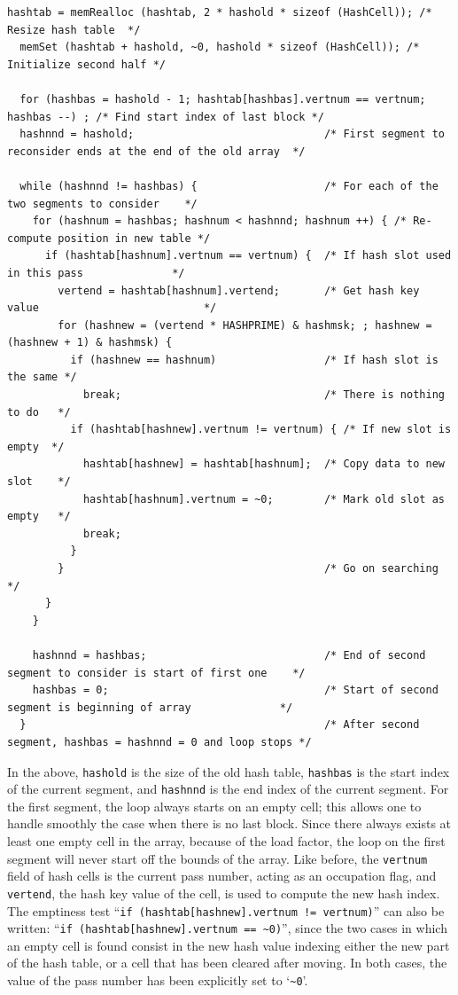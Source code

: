 \begin{lstlisting}[style=language-c]
  hashtab = memRealloc (hashtab, 2 * hashold * sizeof (HashCell)); /* Resize hash table  */
  memSet (hashtab + hashold, ~0, hashold * sizeof (HashCell)); /* Initialize second half */

  for (hashbas = hashold - 1; hashtab[hashbas].vertnum == vertnum; hashbas --) ; /* Find start index of last block */
  hashnnd = hashold;                              /* First segment to reconsider ends at the end of the old array  */

  while (hashnnd != hashbas) {                    /* For each of the two segments to consider    */
    for (hashnum = hashbas; hashnum < hashnnd; hashnum ++) { /* Re-compute position in new table */
      if (hashtab[hashnum].vertnum == vertnum) {  /* If hash slot used in this pass              */
        vertend = hashtab[hashnum].vertend;       /* Get hash key value                          */
        for (hashnew = (vertend * HASHPRIME) & hashmsk; ; hashnew = (hashnew + 1) & hashmsk) {
          if (hashnew == hashnum)                 /* If hash slot is the same */
            break;                                /* There is nothing to do   */
          if (hashtab[hashnew].vertnum != vertnum) { /* If new slot is empty  */
            hashtab[hashnew] = hashtab[hashnum];  /* Copy data to new slot    */
            hashtab[hashnum].vertnum = ~0;        /* Mark old slot as empty   */
            break;
          }
        }                                         /* Go on searching */
      }
    }

    hashnnd = hashbas;                            /* End of second segment to consider is start of first one    */
    hashbas = 0;                                  /* Start of second segment is beginning of array              */
  }                                               /* After second segment, hashbas = hashnnd = 0 and loop stops */
\end{lstlisting}

In the above, \texttt{hashold} is the size of the old hash table,
\texttt{hashbas} is the start index of the current segment, and
\texttt{hashnnd} is the end index of the current segment. For the
first segment, the loop always starts on an empty cell; this allows
one to handle smoothly the case when there is no last block. Since
there always exists at least one empty cell in the array, because of
the load factor, the loop on the first segment will never start off
the bounds of the array. Like before, the \texttt{vertnum} field of
hash cells is the current pass number, acting as an occupation flag,
and \texttt{vertend}, the hash key value of the cell, is used to
compute the new hash index. The emptiness test ``\texttt{if
(hashtab[hashnew].vertnum != vertnum)}'' can also be written:
``\texttt{if (hashtab[hashnew].vertnum == \~{}0)}'', since the two
cases in which an empty cell is found consist in the new hash value
indexing either the new part of the hash table, or a cell that has been
cleared after moving. In both cases, the value of the pass number has
been explicitly set to `\texttt{\~{}0}'.


